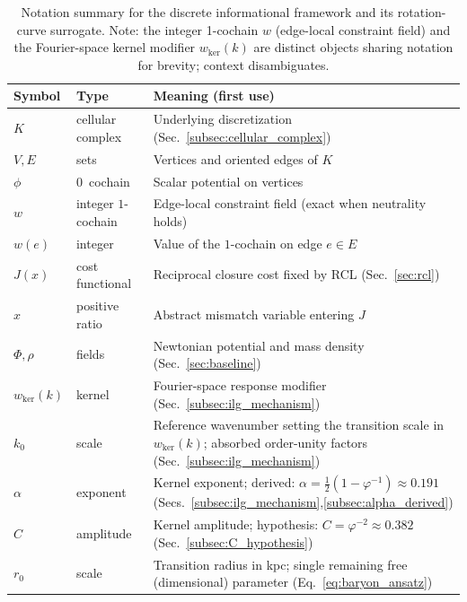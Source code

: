 \documentclass[entropy,article,submit,pdftex,moreauthors]{Definitions/mdpi}
\begin{document}
\begin{table}[htbp]
\centering
\footnotesize
\setlength{\tabcolsep}{4pt}
\renewcommand{\arraystretch}{1.15}
\begin{tabular}{lll}
\toprule
\textbf{Symbol} & \textbf{Type} & \textbf{Meaning (first use)} \\
\midrule
$K$ & cellular complex & \parbox[t]{0.62\textwidth}{Underlying discretization (Sec.~\ref{subsec:cellular_complex})} \\
$V,E$ & sets & \parbox[t]{0.62\textwidth}{Vertices and oriented edges of $K$} \\
$\phi$ & $0$~cochain & \parbox[t]{0.62\textwidth}{Scalar potential on vertices} \\
$w$ & integer $1$-cochain & \parbox[t]{0.62\textwidth}{Edge-local constraint field (exact when neutrality holds)} \\
$w(e)$ & integer & \parbox[t]{0.62\textwidth}{Value of the $1$-cochain on edge $e\in E$} \\
$J(x)$ & cost functional & \parbox[t]{0.62\textwidth}{Reciprocal closure cost fixed by RCL (Sec.~\ref{sec:rcl})} \\
$x$ & positive ratio & \parbox[t]{0.62\textwidth}{Abstract mismatch variable entering $J$} \\
$\Phi,\rho$ & fields & \parbox[t]{0.62\textwidth}{Newtonian potential and mass density (Sec.~\ref{sec:baseline})} \\
$w_{\mathrm{ker}}(k)$ & kernel & \parbox[t]{0.62\textwidth}{Fourier-space response modifier (Sec.~\ref{subsec:ilg_mechanism})} \\
$k_0$ & scale & \parbox[t]{0.62\textwidth}{Reference wavenumber setting the transition scale in $w_{\mathrm{ker}}(k)$; absorbed order-unity factors (Sec.~\ref{subsec:ilg_mechanism})} \\
$\alpha$ & exponent & \parbox[t]{0.62\textwidth}{Kernel exponent; derived: $\alpha=\tfrac{1}{2}(1-\varphi^{-1})\approx 0.191$ (Secs.~\ref{subsec:ilg_mechanism},\ref{subsec:alpha_derived})} \\
$C$ & amplitude & \parbox[t]{0.62\textwidth}{Kernel amplitude; hypothesis: $C=\varphi^{-2}\approx 0.382$ (Sec.~\ref{subsec:C_hypothesis})} \\
$r_0$ & scale & \parbox[t]{0.62\textwidth}{Transition radius in kpc; single remaining free (dimensional) parameter (Eq.~\eqref{eq:baryon_ansatz})} \\
\bottomrule
\end{tabular}
\caption{Notation summary for the discrete informational framework and its rotation-curve surrogate. Note: the integer 1-cochain \(w\) (edge-local constraint field) and the Fourier-space kernel modifier \(w_{\mathrm{ker}}(k)\) are distinct objects sharing notation for brevity; context disambiguates.}
\label{tab:notation_summary}
\end{table}
\end{document}
